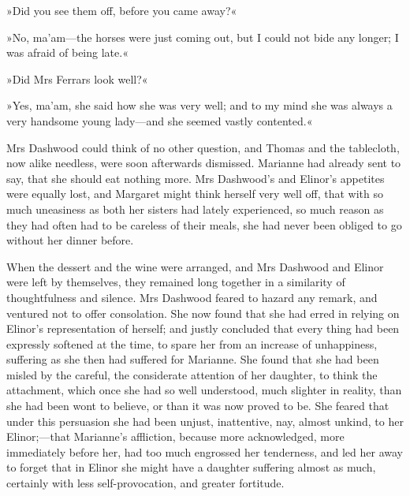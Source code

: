»Did you see them off, before you came away?«

»No, ma’am—the horses were just coming out, but I could not bide any longer; I was afraid of being late.«

»Did Mrs Ferrars look well?«

»Yes, ma’am, she said how she was very well; and to my mind she was always a very handsome young lady—and she seemed vastly contented.«

Mrs Dashwood could think of no other question, and Thomas and the tablecloth, now alike needless, were soon afterwards dismissed. Marianne had already sent to say, that she should eat nothing more. Mrs Dashwood’s and Elinor’s appetites were equally lost, and Margaret might think herself very well off, that with so much uneasiness as both her sisters had lately experienced, so much reason as they had often had to be careless of their meals, she had never been obliged to go without her dinner before.

When the dessert and the wine were arranged, and Mrs Dashwood and Elinor were left by themselves, they remained long together in a similarity of thoughtfulness and silence. Mrs Dashwood feared to hazard any remark, and ventured not to offer consolation. She now found that she had erred in relying on Elinor’s representation of herself; and justly concluded that every thing had been expressly softened at the time, to spare her from an increase of unhappiness, suffering as she then had suffered for Marianne. She found that she had been misled by the careful, the considerate attention of her daughter, to think the attachment, which once she had so well understood, much slighter in reality, than she had been wont to believe, or than it was now proved to be. She feared that under this persuasion she had been unjust, inattentive, nay, almost unkind, to her Elinor;—that Marianne’s affliction, because more acknowledged, more immediately before her, had too much engrossed her tenderness, and led her away to forget that in Elinor she might have a daughter suffering almost as much, certainly with less self-provocation, and greater fortitude.